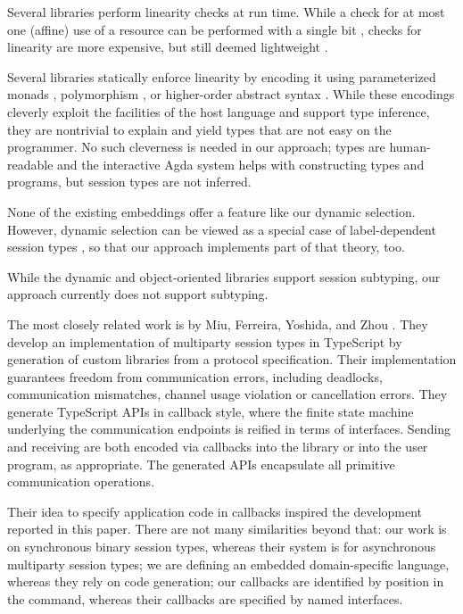 \documentclass[acmsmall,screen]{acmart}
\begin{document}
Several libraries perform
linearity checks at run time. While a check for at most one (affine)
use of a resource can be performed with a single bit
\cite{DBLP:conf/esop/TovP10},  checks for linearity are more
expensive, but still deemed lightweight
\cite{DBLP:conf/fase/HuY16}.

Several libraries statically enforce linearity by encoding it
using parameterized monads
\cite{SackmanE08,DBLP:conf/haskell/PucellaT08},  polymorphism
\cite{DBLP:journals/scp/ImaiYY19}, or higher-order 
abstract syntax \cite{DBLP:conf/haskell/LindleyM16}. While these
encodings cleverly exploit the facilities of the host language and
support type inference, they
are nontrivial to explain and yield types that are not easy on the
programmer. No such cleverness is needed in our approach; types are
human-readable and the interactive Agda system helps with constructing
types and programs, but session types are not inferred.

None of the existing embeddings offer a feature like our dynamic
selection. However, dynamic selection can be viewed as a special case
of label-dependent session types
\cite{DBLP:journals/pacmpl/ThiemannV20}, so that our  approach
implements part of that theory, too.

While the dynamic and object-oriented libraries support session
subtyping, our approach currently does not support subtyping. 


The most closely related work is by Miu, Ferreira, Yoshida, and Zhou
\cite{DBLP:conf/cc/Miu0Y021}. They develop an
implementation of multiparty session types in TypeScript by generation
of custom libraries from a protocol specification. Their
implementation guarantees freedom from
communication errors, including deadlocks, communication
mismatches, channel usage violation or cancellation errors. They
generate TypeScript APIs in callback style, where the finite state
machine underlying the communication endpoints is reified in terms of
interfaces. Sending and receiving are both encoded via callbacks 
into the library or into the user program, as appropriate. The
generated APIs encapsulate all primitive communication operations.

Their idea to specify application code in callbacks inspired the
development reported in this paper. There are not many similarities
beyond that: our work is on synchronous binary session types, whereas
their system is for asynchronous multiparty session types; we are
defining an embedded domain-specific language, whereas they rely on
code generation; our callbacks are identified by position in the
command, whereas their callbacks are specified by named interfaces.
\end{document}
